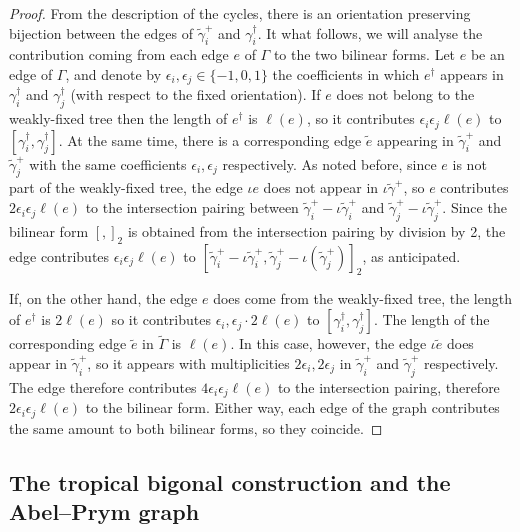 \documentclass[11pt]{article}
\theoremstyle{definition}
\numberwithin{equation}{section}
\theoremstyle{definition}
\newcommand{\wt}[1]{\widetilde{#1}}
\begin{document}
\begin{proof}
From the description of the cycles, there is an orientation preserving bijection between the edges of $\wt\gamma_i^+$ and $\gamma_i^{\dagger}$. It what follows, we will analyse the contribution coming from each edge $e$ of $\Gamma$ to the two bilinear forms. 
Let $e$ be an edge of $\Gamma$, and denote by $\epsilon_i,\epsilon_j\in\{-1,0,1\}$ the coefficients in which 
 $e^{\dagger}$  appears in $\gamma_i^{\dagger}$ and $\gamma_j^{\dagger}$    (with respect to the fixed orientation). If $e$ does not belong to the weakly-fixed tree then the length of $e^{\dagger}$ is $\ell(e)$, so  it contributes $\epsilon_i\epsilon_j\ell(e)$ to $[\gamma_i^{\dagger},\gamma_j^{\dagger}]$. At the same time, there is a corresponding edge $\tilde e$ appearing in $\wt\gamma_i^{+}$ and $\wt\gamma_j^{+}$ with the same coefficients $\epsilon_i,\epsilon_j$ respectively.  As noted before, since $e$ is not part of the weakly-fixed tree,  the edge $\iota e$ does not appear in $\iota\wt\gamma^+$, so $e$ contributes  $2\epsilon_i\epsilon_j\ell(e)$ to the intersection pairing between $\wt\gamma_i^{+} - \iota\wt\gamma_i^{+}$ and $\wt\gamma_j^{+} - \iota\wt\gamma_j^{+}$. Since the bilinear form $[,]_2$ is obtained from the intersection pairing by division by 2, the edge contributes $\epsilon_i\epsilon_j\ell(e)$ to $[\wt\gamma_i^{+} - \iota\wt\gamma_i^{+}, \wt\gamma_j^{+} - \iota(\wt\gamma_j^{+})]_2$, as anticipated. 

If, on the other hand, the edge $e$ does come from the weakly-fixed tree, the length of $e^{\dagger}$  is $2\ell(e)$ so it contributes $\epsilon_i,\epsilon_j\cdot 2\ell(e)$ to $[\gamma_i^{\dagger},\gamma_j^{\dagger}]$. The length of  the corresponding edge $\tilde e$  in $\wt\Gamma$ is $\ell(e)$. 
In this case, however, the edge $\iota\tilde e$ does appear in $\wt\gamma^{+}_i$, so it appears with multiplicities $2\epsilon_i,2\epsilon_j$ in $\wt\gamma_i^{+}$ and $\wt\gamma_j^{+}$ respectively. The edge therefore contributes  $4\epsilon_i\epsilon_j\ell(e)$ to the intersection pairing, therefore $2\epsilon_i\epsilon_j\ell(e)$ to the bilinear form. Either way, each edge of the graph contributes the same amount to both bilinear forms, so they coincide. 
    \end{proof}



 \subsection{The tropical bigonal construction and the Abel--Prym graph}
\end{document}
